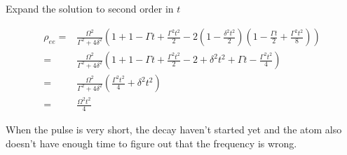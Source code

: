 \documentclass[10pt,fleqn]{article}
\newcommand{\eqar}[1]
{
  \begin{align*}
    #1
  \end{align*}
}
\newcommand{\paren}[1]{{\left({#1}\right)}}
\begin{document}
\subsection{}
Expand the solution to second order in $t$
\eqar{
  \rho_{ee}=&\frac{\Omega^2}{\Gamma^2+4\delta^2}\paren{1+1-\Gamma t+\frac{\Gamma^2t^2}{2}-2\paren{1-\frac{\delta^2t^2}{2}}\paren{1-\frac{\Gamma t}{2}+\frac{\Gamma^2t^2}{8}}}\\
  =&\frac{\Omega^2}{\Gamma^2+4\delta^2}\paren{1+1-\Gamma t+\frac{\Gamma^2t^2}{2}-2+\delta^2t^2+\Gamma t-\frac{\Gamma^2t^2}{4}}\\
  =&\frac{\Omega^2}{\Gamma^2+4\delta^2}\paren{\frac{\Gamma^2t^2}{4}+\delta^2t^2}\\
  =&\frac{\Omega^2t^2}{4}
}
When the pulse is very short, the decay haven't started yet and the atom also doesn't have enough time to figure out that the frequency is wrong.

\section{}
\subsection{}
\subsection{}
\subsection{}
\subsection{}
\subsection{}
\subsection{}

\section{}
\subsection{}
\subsection{}
\subsection{}
\subsection{}
\subsection{}
\end{document}
